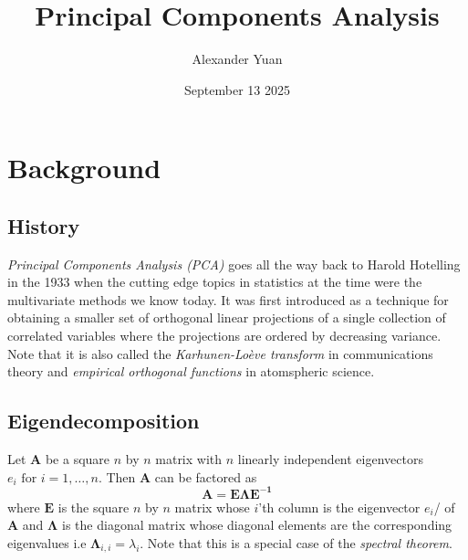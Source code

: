 \documentclass{article}
\title{Principal Components Analysis}
\author{Alexander Yuan}
\date{September 13 2025}
\begin{document}
 
\maketitle

\section{Background}
\subsection{History}
\emph{Principal Components Analysis (PCA)} goes all the way back to Harold Hotelling in the 1933 when the cutting edge topics in statistics at the time were the multivariate methods we know today. It was first 
introduced as a technique for obtaining a smaller set of orthogonal linear projections of a single collection of correlated variables where the projections are ordered by decreasing variance. Note that it is also
called the \emph{Karhunen-Loève transform} in communications theory and \emph{empirical orthogonal functions} in atomspheric science.

\subsection{Eigendecomposition}
Let $\mathbf{A}$ be a square $n$ by $n$ matrix with $n$ linearly independent eigenvectors $e_i \text{ for } i = 1, \ldots , n$. Then $\mathbf{A}$ can be factored as 
$$
\mathbf{A = E \Lambda E^{-1}}
$$
where $\mathbf{E}$ is the square $n$ by $n$ matrix whose $i$'th column is the eigenvector $e_i$/ of $\mathbf{A}$ and $\mathbf{\Lambda}$ is the diagonal matrix whose diagonal elements are the corresponding eigenvalues 
i.e $\mathbf{\Lambda}_{i,i}= \lambda_i$. Note that this is a special case of the \emph{spectral theorem}.
\end{document}
